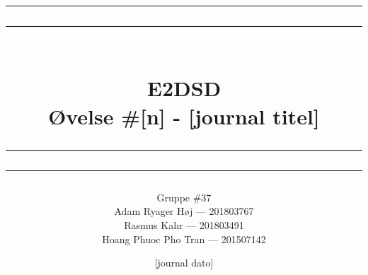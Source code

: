 \documentclass[12pt,a4paper]{article}
\newcommand\mymaketitle[1]{
   \rule{\textwidth}{1.6pt}\vspace*{-\baselineskip}\vspace*{2pt}
   \rule{\textwidth}{0.4pt}
   \\   
   \huge \bf #1\\
   \vspace{-8pt}
   \rule{\textwidth}{0.4pt}\vspace*{-\baselineskip}\vspace{3.2pt}
   \rule{\textwidth}{1.6pt}
}
\begin{document}
\title{
	\mymaketitle{E2DSD\\Øvelse \#[n] - [journal titel]}
}
\author{
	Gruppe \#37\\
	Adam Ryager Høj --- 201803767\\
   Rasmus Kahr --- 201803491\\
   Hoang Phuoc Pho Tran --- 201507142
}
\date{[journal dato]}

\maketitle
\newpage
\end{document}
